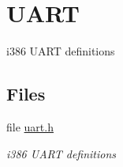 \hypertarget{group__i386__uart}{}\section{U\+A\+RT}
\label{group__i386__uart}


i386 U\+A\+RT definitions  


\subsection*{Files}
\begin{DoxyCompactItemize}
\item 
file \mbox{\hyperlink{i386_2include_2uart_8h}{uart.\+h}}
\begin{DoxyCompactList}\small\item\em i386 U\+A\+RT definitions \end{DoxyCompactList}\end{DoxyCompactItemize}

